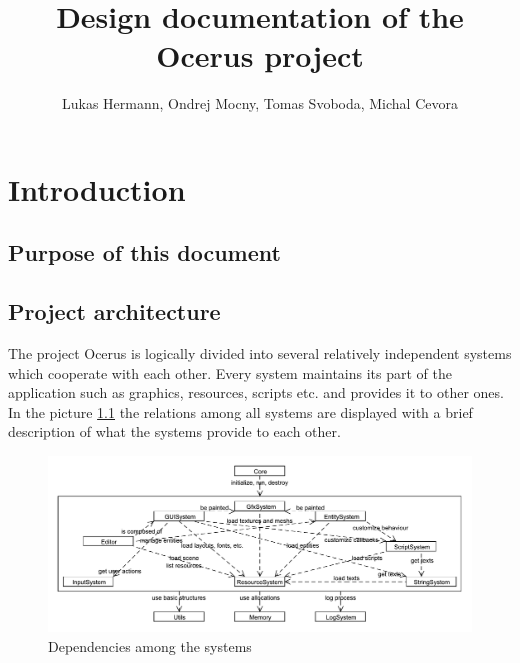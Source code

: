 \documentclass[a4paper, 12pt]{report}
\begin{document}
\pagestyle{empty} %

\title{Design documentation of the Ocerus project}
\author{Lukas Hermann, Ondrej Mocny, Tomas Svoboda, Michal Cevora}
\maketitle

\pagestyle{plain} %
\setcounter{page}{2}

\tableofcontents %
\cleardoublepage %

\chapter{Introduction}

\section{Purpose of this document}

\section{Project architecture}

The project Ocerus is logically divided into several relatively independent systems which cooperate with each other. Every system maintains its part of the application such as graphics, resources, scripts etc. and provides it to other ones. In the picture \ref{fig:system-connection} the relations among all systems are displayed with a brief description of what the systems provide to each other.

\begin{figure}[htbp]
	\centering
		\includegraphics[width=1\textwidth]{SystemConnection.pdf}
	\caption{Dependencies among the systems}
	\label{fig:system-connection}
\end{figure}
\end{document}
